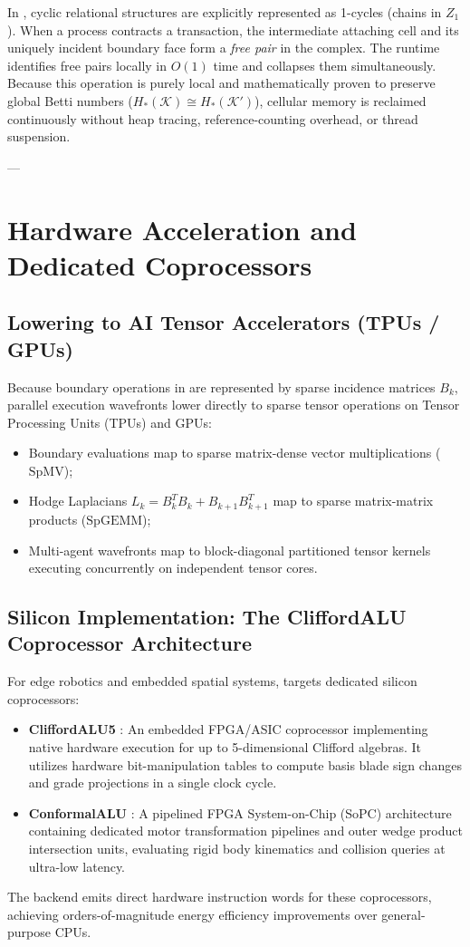 In \ToposLang{}, cyclic relational structures are explicitly represented as 1-cycles (chains in $Z_1$). When a process contracts a transaction, the intermediate attaching cell and its uniquely incident boundary face form a \textit{free pair} in the complex. The runtime identifies free pairs locally in $O(1)$ time and collapses them simultaneously. Because this operation is purely local and mathematically proven to preserve global Betti numbers ($H_*(\mathcal{K}) \cong H_*(\mathcal{K}')$), cellular memory is reclaimed continuously without heap tracing, reference-counting overhead, or thread suspension.

---

\section{Hardware Acceleration and Dedicated Coprocessors}
\label{sec:hardware_coprocessors}

\subsection{Lowering to AI Tensor Accelerators (TPUs / GPUs)}
Because boundary operations in \ToposLang{} are represented by sparse incidence matrices $B_k$, parallel execution wavefronts lower directly to sparse tensor operations on Tensor Processing Units (TPUs) and GPUs:
\begin{itemize}[leftmargin=1.5cm]
    \item Boundary evaluations map to sparse matrix-dense vector multiplications ($\text{SpMV}$);
    \item Hodge Laplacians $L_k = B_k^T B_k + B_{k+1} B_{k+1}^T$ map to sparse matrix-matrix products ($\text{SpGEMM}$);
    \item Multi-agent wavefronts map to block-diagonal partitioned tensor kernels executing concurrently on independent tensor cores.
\end{itemize}

\subsection{Silicon Implementation: The CliffordALU Coprocessor Architecture}
For edge robotics and embedded spatial systems, \ToposLang{} targets dedicated silicon coprocessors:
\begin{itemize}[leftmargin=1.5cm]
    \item \textbf{CliffordALU5} \cite{breuils2013embedded}: An embedded FPGA/ASIC coprocessor implementing native hardware execution for up to 5-dimensional Clifford algebras. It utilizes hardware bit-manipulation tables to compute basis blade sign changes and grade projections in a single clock cycle.
    \item \textbf{ConformalALU} \cite{rodriguez2022optimized}: A pipelined FPGA System-on-Chip (SoPC) architecture containing dedicated motor transformation pipelines and outer wedge product intersection units, evaluating rigid body kinematics and collision queries at ultra-low latency.
\end{itemize}
The \ToposLang{} backend emits direct hardware instruction words for these coprocessors, achieving orders-of-magnitude energy efficiency improvements over general-purpose CPUs.
